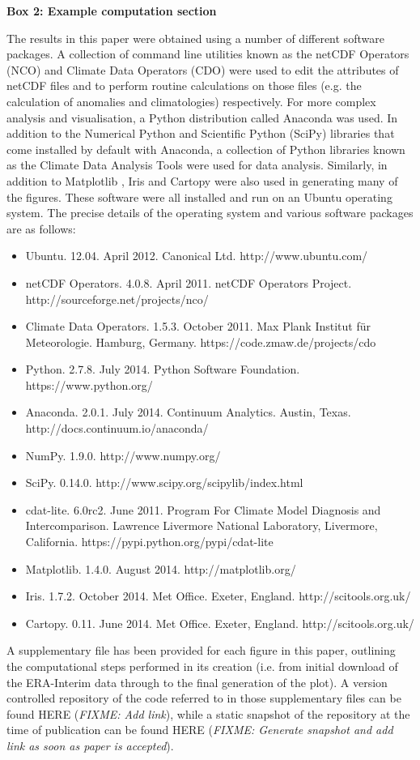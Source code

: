 \textbf{Box 2: Example computation section}

The results in this paper were obtained using a number of different software packages. A collection of command line utilities known as the netCDF Operators (NCO) and Climate Data Operators (CDO) were used to edit the attributes of netCDF files and to perform routine calculations on those files (e.g. the calculation of anomalies and climatologies) respectively. For more complex analysis and visualisation, a Python distribution called Anaconda was used. In addition to the Numerical Python \citep[NumPy;][]{VanDerWalt2011} and Scientific Python (SciPy) libraries that come installed by default with Anaconda, a collection of Python libraries known as the Climate Data Analysis Tools \citep[CDAT;][]{Doutriaux2009} were used for data analysis. Similarly, in addition to Matplotlib \citep[the default Python plotting library;][]{Hunter2007}, Iris and Cartopy were also used in generating many of the figures. These software were all installed and run on an Ubuntu operating system. The precise details of the operating system and various software packages are as follows:
\begin{itemize}
\item Ubuntu. 12.04. April 2012. Canonical Ltd. http://www.ubuntu.com/
\item netCDF Operators. 4.0.8. April 2011. netCDF Operators Project. http://sourceforge.net/projects/nco/
\item Climate Data Operators. 1.5.3. October 2011. Max Plank Institut f{\"u}r Meteorologie. Hamburg, Germany. https://code.zmaw.de/projects/cdo
\item Python. 2.7.8. July 2014. Python Software Foundation. https://www.python.org/
\item Anaconda. 2.0.1. July 2014. Continuum Analytics. Austin, Texas. http://docs.continuum.io/anaconda/
\item NumPy. 1.9.0. http://www.numpy.org/
\item SciPy. 0.14.0. http://www.scipy.org/scipylib/index.html
\item cdat-lite. 6.0rc2. June 2011. Program For Climate Model Diagnosis and Intercomparison. Lawrence Livermore National Laboratory, Livermore, California. https://pypi.python.org/pypi/cdat-lite
\item Matplotlib. 1.4.0. August 2014.  http://matplotlib.org/
\item Iris. 1.7.2. October 2014. Met Office. Exeter, England. http://scitools.org.uk/
\item Cartopy. 0.11. June 2014. Met Office. Exeter, England. http://scitools.org.uk/
\end{itemize}

A supplementary file has been provided for each figure in this paper, outlining the computational steps performed in its creation (i.e. from initial download of the ERA-Interim data through to the final generation of the plot). A version controlled repository of the code referred to in those supplementary files can be found HERE (\textit{FIXME: Add link}), while a static snapshot of the repository at the time of publication can be found HERE (\textit{FIXME: Generate snapshot and add link as soon as paper is accepted}).